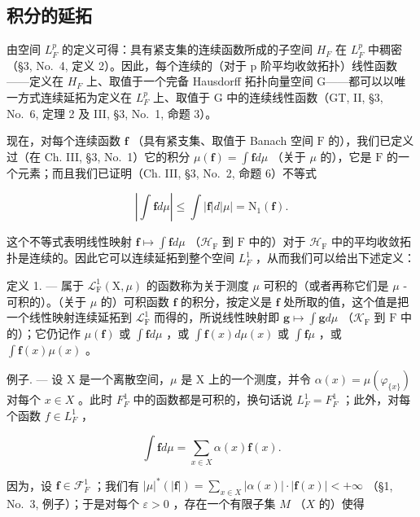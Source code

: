 \subsection{积分的延拓}

由空间 \(L_{F}^{p}\) 的定义可得：具有紧支集的连续函数所成的子空间 \(H_{F}\) 在 \(L_{F}^{p}\) 中稠密（§3, No.~4, 定义 2）。因此，每个连续的（对于 p 阶平均收敛拓扑）线性函数——定义在 \(H_{F}\) 上、取值于一个完备 Hausdorff 拓扑向量空间 G——都可以以唯一方式连续延拓为定义在 \(L_{F}^{p}\) 上、取值于 G 中的连续线性函数（GT, II, §3, No.~6, 定理 2 及 III, §3, No.~1, 命题 3）。

现在，对每个连续函数 \(\mathbf{f}\) （具有紧支集、取值于 Banach 空间 \(\mathrm{F}\) 的），我们已定义过（在 Ch. III, §3, No.~1）它的积分 \(\mu(\mathbf{f}) = \int \mathbf{f} d\mu\) （关于 \(\mu\) 的），它是 \(\mathrm{F}\) 的一个元素；而且我们已证明（Ch. III, §3, No.~2, 命题 6）不等式

\[
\left| \int \mathbf {f} d \mu \right| \leqslant \int | \mathbf {f} | d | \mu | = \mathrm{N} _ {1} (\mathbf {f}).\tag{1}
\]

这个不等式表明线性映射 \(\mathbf{f} \mapsto \int \mathbf{f} d\mu\) （\(\mathcal{H}_{\mathrm{F}}\) 到 \(\mathrm{F}\) 中的）对于 \(\mathcal{H}_{\mathrm{F}}\) 中的平均收敛拓扑是连续的。因此它可以连续延拓到整个空间 \(L_{F}^{1}\) ，从而我们可以给出下述定义：

定义 1. --- 属于 \(\mathcal{L}_{\mathrm{F}}^{1}(\mathrm{X},\mu)\) 的函数称为关于测度 \(\mu\) 可积的（或者再称它们是 \(\mu\) -可积的）。（关于 \(\mu\) 的）可积函数 \(\mathbf{f}\) 的积分，按定义是 \(\mathbf{f}\) 处所取的值，这个值是把一个线性映射连续延拓到 \(\mathcal{L}_{\mathrm{F}}^{1}\) 而得的，所说线性映射即 \(\mathbf{g} \mapsto \int \mathbf{g} d\mu\) （\(\mathcal{K}_{\mathrm{F}}\) 到 \(\mathrm{F}\) 中的）；它仍记作 \(\mu(\mathbf{f})\) 或 \(\int \mathbf{f} d\mu\) ，或 \(\int \mathbf{f}(x) d\mu(x)\) 或 \(\int \mathbf{f}\mu\) ，或 \(\int \mathbf{f}(x)\mu(x)\) 。

例子. --- 设 X 是一个离散空间，\(\mu\) 是 X 上的一个测度，并令 \(\alpha(x) = \mu(\varphi_{\{x\}})\) 对每个 \(x \in X\) 。此时 \(F_{F}^{1}\) 中的函数都是可积的，换句话说 \(L_{F}^{1} = F_{F}^{1}\) ；此外，对每个函数 \(f \in L_{F}^{1}\) ，

\[
\int \mathbf {f} d \mu = \sum_ {x \in X} \alpha (x) \mathbf {f} (x).
\]

因为，设 \(\mathbf{f} \in \mathcal{F}_F^1\) ；我们有 \(|\mu|^*(|\mathbf{f}|) = \sum_{x \in X} |\alpha(x)| \cdot |\mathbf{f}(x)| < +\infty\) （§1, No.~3, 例子）；于是对每个 \(\varepsilon > 0\) ，存在一个有限子集 \(M\) （\(X\) 的）使得


